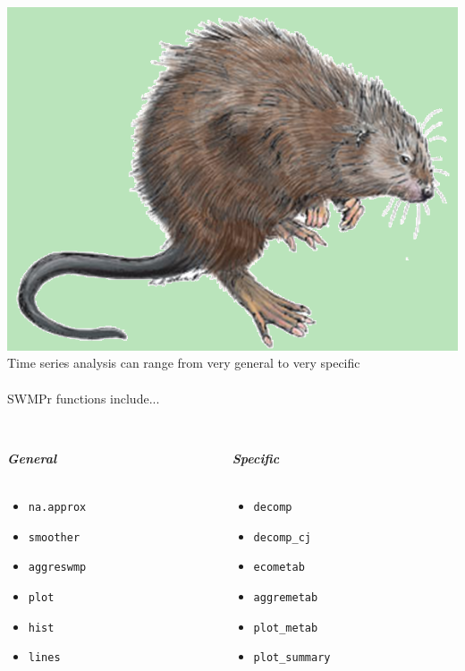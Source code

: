 \documentclass[serif]{beamer}\usepackage[]{graphicx}\usepackage[]{color}
\newcommand{\Bigtxt}[1]{\textbf{\textit{#1}}}
\begin{document}
\begin{frame}[fragile]{\includegraphics[width=0.05\paperwidth]{fig/muskrat.png}\hspace{0.07in}{\bf SWMPrats.net: The SWMPr package}}
Time series analysis can range from very general to very specific \\~\\
SWMPr functions include...\\~\\
\begin{columns}
\begin{column}{0.45\textwidth}
\Bigtxt{General} \\~\\
\begin{itemize}
\item \texttt{na.approx}
\item \texttt{smoother}
\item \texttt{aggreswmp}
\item \texttt{plot}
\item \texttt{hist}
\item \texttt{lines}
\end{itemize}
\end{column}
\begin{column}{0.45\textwidth}
\Bigtxt{Specific} \\~\\
\begin{itemize}
\item \texttt{decomp}
\item \texttt{decomp\_cj}
\item \texttt{ecometab}
\item \texttt{aggremetab}
\item \texttt{plot\_metab}
\item \texttt{plot\_summary}
\end{itemize}
\end{column}
\end{columns}
\end{frame}
\end{document}
